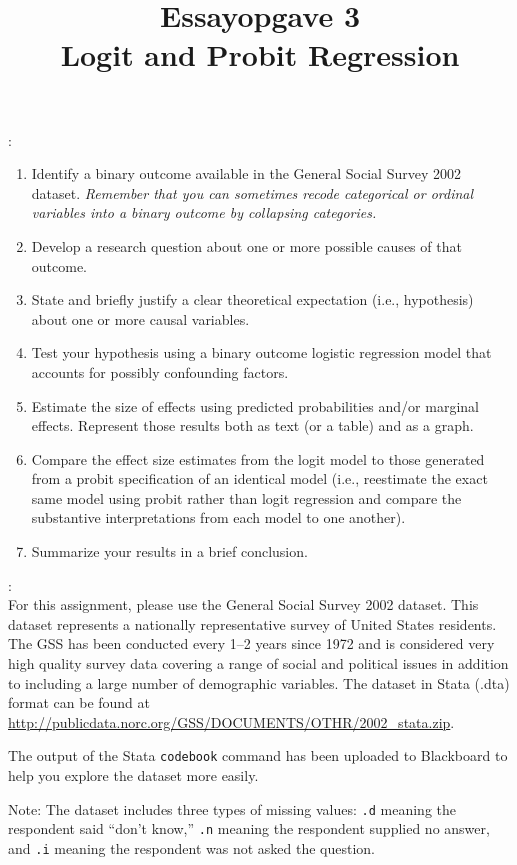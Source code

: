 \documentclass[a4paper,11pt]{article}
\title{Essayopgave 3\\Logit and Probit Regression}
\author{}
\date{}
\begin{document}
\maketitle


\vspace{2em}

:
\begin{enumerate}
\item Identify a binary outcome available in the General Social Survey 2002 dataset. {\em Remember that you can sometimes recode categorical or ordinal variables into a binary outcome by collapsing categories.}
\item Develop a research question about one or more possible causes of that outcome.
\item State and briefly justify a clear theoretical expectation (i.e., hypothesis) about one or more causal variables.
\item Test your hypothesis using a binary outcome logistic regression model that accounts for possibly confounding factors.
\item Estimate the size of effects using predicted probabilities and/or marginal effects. Represent those results both as text (or a table) and as a graph.
\item Compare the effect size estimates from the logit model to those generated from a probit specification of an identical model (i.e., reestimate the exact same model using probit rather than logit regression and compare the substantive interpretations from each model to one another).
\item Summarize your results in a brief conclusion.
\end{enumerate}

:\\

For this assignment, please use the General Social Survey 2002 dataset. This dataset represents a nationally representative survey of United States residents. The GSS has been conducted every 1--2 years since 1972 and is considered very high quality survey data covering a range of social and political issues in addition to including a large number of demographic variables. The dataset in Stata (.dta) format can be found at \url{http://publicdata.norc.org/GSS/DOCUMENTS/OTHR/2002_stata.zip}.

The output of the Stata \texttt{codebook} command has been uploaded to Blackboard to help you explore the dataset more easily.

Note: The dataset includes three types of missing values: \texttt{.d} meaning the respondent said ``don't know,'' \texttt{.n} meaning the respondent supplied no answer, and \texttt{.i} meaning the respondent was not asked the question.
\end{document}
